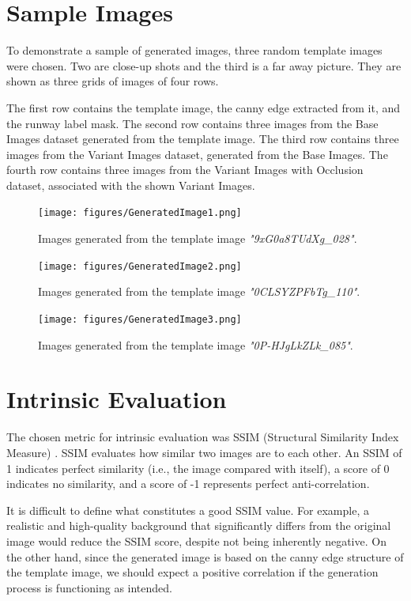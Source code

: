 \section{Sample Images}

To demonstrate a sample of generated images, three random template images were
chosen. Two are close-up shots and the third is a far away picture. They
are shown as three grids of images of four rows.

The first row contains the template image, the canny edge extracted from it,
and the runway label mask. The second row contains three images from the Base
Images dataset generated from the template image. The third row contains three
images from the Variant Images dataset, generated from the Base Images. The
fourth row contains three images from the Variant Images with Occlusion dataset,
associated with the shown Variant Images.

\begin{figure}[htbp]
\centering
\texttt{[image: figures/GeneratedImage1.png]}
  \caption{Images generated from the template image \emph{"9xG0a8TUdXg\_028"}.}
\end{figure}

\begin{figure}[htbp]
\centering
\texttt{[image: figures/GeneratedImage2.png]}
  \caption{Images generated from the template image \emph{"0CLSYZPFbTg\_110"}.}
\end{figure}

\begin{figure}[htbp]
\centering
\texttt{[image: figures/GeneratedImage3.png]}
  \caption{Images generated from the template image \emph{"0P-HJgLkZLk\_085"}.}
\end{figure}

\FloatBarrier
\section{Intrinsic Evaluation}

The chosen metric for intrinsic evaluation was SSIM (Structural Similarity Index Measure) \cite{wang_image_2004}. 
SSIM evaluates how similar two images are to each other. 
An SSIM of 1 indicates perfect similarity (i.e., the image compared with itself), a score of 0 indicates no similarity, and a score of -1 represents perfect anti-correlation.

It is difficult to define what constitutes a good SSIM value. 
For example, a realistic and high-quality background that significantly differs from the original image would reduce the SSIM score, despite not being inherently negative. 
On the other hand, since the generated image is based on the canny edge structure of the template image, we should expect a positive correlation if the generation process is functioning as intended.

